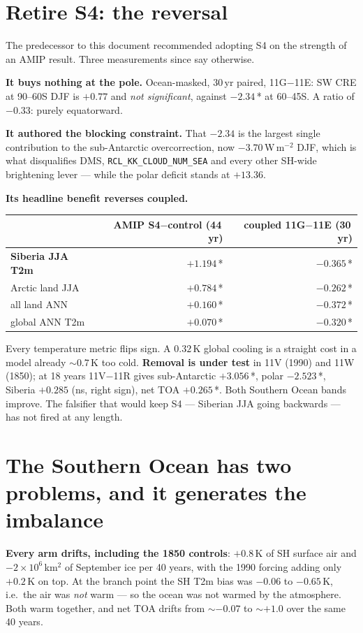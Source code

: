 \documentclass[10pt]{article}
\begin{document}
\section{Retire S4: the reversal}\label{sec:s4}
The predecessor to this document recommended adopting S4 on the strength of an AMIP
result. Three measurements since say otherwise.

\textbf{It buys nothing at the pole.} Ocean-masked, 30\,yr paired, 11G$-$11E: SW CRE at
90--60S DJF is $+0.77$ and \emph{not significant}, against $-2.34$\,* at 60--45S. A ratio
of $-0.33$: purely equatorward.

\textbf{It authored the blocking constraint.} That $-2.34$ is the largest single
contribution to the sub-Antarctic overcorrection, now $-3.70$\,W\,m$^{-2}$ DJF, which is
what disqualifies DMS, \texttt{RCL\_KK\_CLOUD\_NUM\_SEA} and every other SH-wide
brightening lever --- while the polar deficit stands at $+13.36$.

\textbf{Its headline benefit reverses coupled.}

\begin{center}\small
\begin{tabular}{lrr}
\toprule
& AMIP S4$-$control (44\,yr) & coupled 11G$-$11E (30\,yr) \\
\midrule
\textbf{Siberia JJA T2m} & $\mathbf{+1.194}$\,* & $\mathbf{-0.365}$\,* \\
Arctic land JJA & $+0.784$\,* & $-0.262$\,* \\
all land ANN & $+0.160$\,* & $-0.372$\,* \\
global ANN T2m & $+0.070$\,* & $\mathbf{-0.320}$\,* \\
\bottomrule
\end{tabular}
\end{center}

Every temperature metric flips sign. A $0.32$\,K global cooling is a straight cost in a
model already ${\sim}0.7$\,K too cold. \textbf{Removal is under test} in 11V (1990) and
11W (1850); at 18 years 11V$-$11R gives sub-Antarctic $+3.056$\,*, polar $-2.523$\,*,
Siberia $+0.285$ (ns, right sign), net TOA $+0.265$\,*. Both Southern Ocean bands improve.
The falsifier that would keep S4 --- Siberian JJA going backwards --- has not fired at any
length.

\section{The Southern Ocean has two problems, and it generates the imbalance}\label{sec:so}
\textbf{Every arm drifts, including the 1850 controls}: $+0.8$\,K of SH surface air and
$-2\times10^6$\,km$^2$ of September ice per 40 years, with the 1990 forcing adding only
$+0.2$\,K on top. At the branch point the SH T2m bias was $-0.06$ to $-0.65$\,K, i.e.\ the
air was \emph{not} warm --- so the ocean was not warmed by the atmosphere. Both warm
together, and net TOA drifts from ${\sim}-0.07$ to ${\sim}+1.0$ over the same 40 years.
\end{document}
